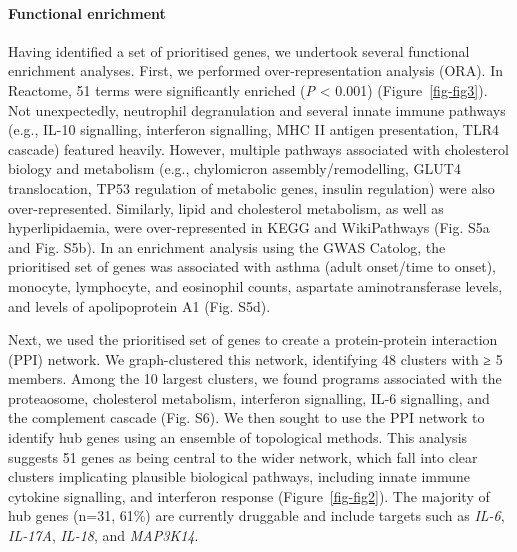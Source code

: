\documentclass[
  11,
  a4paper,
]{article}
\let\oldparagraph\paragraph
\renewcommand{\paragraph}[1]{\oldparagraph{#1}\mbox{}}
\begin{document}
\paragraph{Functional enrichment}\label{functional-enrichment}

Having identified a set of prioritised genes, we undertook several
functional enrichment analyses. First, we performed over-representation
analysis (ORA). In Reactome, 51 terms were significantly enriched
(\emph{P} \textless{} 0.001) (Figure~\ref{fig-fig3}). Not unexpectedly,
neutrophil degranulation and several innate immune pathways (e.g., IL-10
signalling, interferon signalling, MHC II antigen presentation, TLR4
cascade) featured heavily. However, multiple pathways associated with
cholesterol biology and metabolism (e.g., chylomicron
assembly/remodelling, GLUT4 translocation, TP53 regulation of metabolic
genes, insulin regulation) were also over-represented. Similarly, lipid
and cholesterol metabolism, as well as hyperlipidaemia, were
over-represented in KEGG and WikiPathways (Fig. S5a and Fig. S5b). In an
enrichment analysis using the GWAS Catolog, the prioritised set of genes
was associated with asthma (adult onset/time to onset), monocyte,
lymphocyte, and eosinophil counts, aspartate aminotransferase levels,
and levels of apolipoprotein A1 (Fig. S5d).

Next, we used the prioritised set of genes to create a protein-protein
interaction (PPI) network. We graph-clustered this network, identifying
48 clusters with ≥ 5 members. Among the 10 largest clusters, we found
programs associated with the proteaosome, cholesterol metabolism,
interferon signalling, IL-6 signalling, and the complement cascade (Fig.
S6). We then sought to use the PPI network to identify hub genes using
an ensemble of topological methods. This analysis suggests 51 genes as
being central to the wider network, which fall into clear clusters
implicating plausible biological pathways, including innate immune
cytokine signalling, and interferon response (Figure~\ref{fig-fig2}).
The majority of hub genes (n=31, 61\%) are currently druggable and
include targets such as \emph{IL-6}, \emph{IL-17A}, \emph{IL-18}, and
\emph{MAP3K14}.
\end{document}
